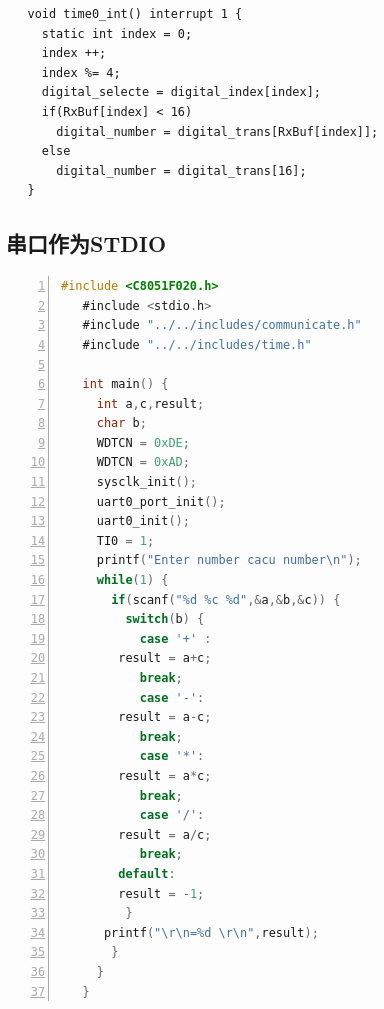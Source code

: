 \documentclass{article}
\begin{document}
\begin{CJK}{UTF8}{gkai}
\begin{lstlisting}
   void time0_int() interrupt 1 {
     static int index = 0;
     index ++;
     index %= 4;
     digital_selecte = digital_index[index];
     if(RxBuf[index] < 16)
       digital_number = digital_trans[RxBuf[index]];
     else
       digital_number = digital_trans[16];
   }

\end{lstlisting}
\subsection{串口作为STDIO}
\begin{lstlisting}[language=C,numbers=left,numberstyle=\tiny,%frame=shadowbox,
   rulesepcolor=\color{red!20!green!20!blue!20},
   keywordstyle=\color{blue!70!black},
   commentstyle=\color{blue!90!},
   basicstyle=\ttfamily]
   #include <C8051F020.h>
   #include <stdio.h>
   #include "../../includes/communicate.h"
   #include "../../includes/time.h"

   int main() {
     int a,c,result;
     char b;
     WDTCN = 0xDE;
     WDTCN = 0xAD;
     sysclk_init();
     uart0_port_init();
     uart0_init();
     TI0 = 1;
     printf("Enter number cacu number\n");
     while(1) {
       if(scanf("%d %c %d",&a,&b,&c)) {
         switch(b) {
           case '+' :
   		result = a+c;
           break;
           case '-':
   		result = a-c;
           break;
           case '*':
   		result = a*c;
           break;
           case '/':
   		result = a/c;
           break;
   		default:
   		result = -1;
         }
   	  printf("\r\n=%d \r\n",result);
       }
     }
   }

\end{lstlisting}
\end{CJK}
\end{document}
